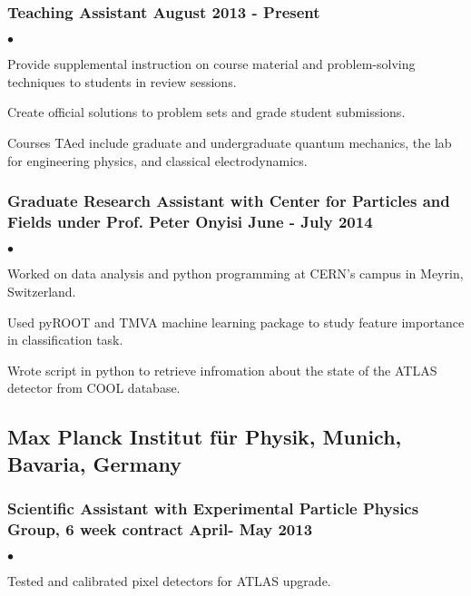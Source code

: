 \documentclass[letterpaper]{article}
\renewenvironment{itemize}{
  \begin{list}{$\bullet$}{
    \setlength{\itemsep}{0em}
    \setlength{\parskip}{0em}
    \setlength{\parsep}{0em} 
    \setlength{\topsep}{0em} 
  }
}{
  \end{list}
}
\begin{document}
\subsubsection*{Teaching Assistant \hfill August 2013 - Present}
    \begin{itemize}
    
        \item Provide supplemental instruction on course material and problem-solving techniques to students in review sessions.
        \item Create official solutions to problem sets and grade student submissions.
        \item Courses TAed include graduate and undergraduate quantum mechanics, the lab for engineering physics, and classical electrodynamics.
        
    \end{itemize}
    
\subsubsection*{Graduate Research Assistant with Center for Particles and Fields under Prof. Peter Onyisi \hfill June - July 2014}
    \begin{itemize}
    
    	\item Worked on data analysis and python programming at CERN's campus in Meyrin, Switzerland.
        \item Used pyROOT and TMVA machine learning package to study feature importance in classification task.
        \item Wrote script in python to retrieve infromation about the state of the ATLAS detector from COOL database.
        
    \end{itemize}
    
\subsection*{Max Planck Institut f\"ur Physik, Munich, Bavaria, Germany}

\subsubsection*{Scientific Assistant with Experimental Particle Physics Group, 6 week contract \hfill April- May 2013}
    \begin{itemize}
        \item Tested and calibrated pixel detectors for ATLAS upgrade. 
    \end{itemize}
\end{document}
